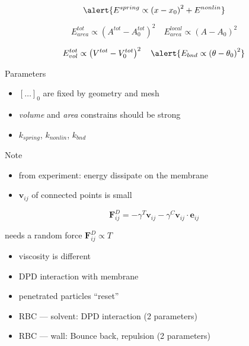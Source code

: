 \bframe{}
\bcc  
  \bc
  \ec
\ecc  
\eframe

\[
  \alert{E^{spring} \propto \left( x - x_0 \right)^2 + E^{nonlin}}
\]

\[
  E^{tot}_{area} \propto \left( A^{tot} - A_{0}^{tot} \right)^2 \quad
  E^{local}_{area} \propto \left( A - A_{0} \right)^2
\]

\[
         E^{tot}_{vol} \propto \left( V^{tot} - V_{0}^{tot} \right)^2 \quad
  \alert{E_{bnd} \propto \left(\theta - \theta_0 \right)^2}
\]

\begin{exampleblock}{Parameters}
  \begin{itemize}
  \item $[\ldots]_0$ are fixed by geometry and mesh
  \item \textit{volume} and \textit{area} constrains should be strong
  \item $k_{spring}$, $k_{nonlin}$, $k_{bnd}$
  \end{itemize}
\end{exampleblock}
\eframe

\begin{exampleblock}{Note}
  \begin{itemize}
    \item from experiment: energy dissipate on the membrane
    \item $\mathbf{v}_{ij}$ of connected points is small
  \end{itemize}
\end{exampleblock}
  
\[
\mathbf{F}_{ij}^D = - \gamma^T \mathbf{v}_{ij} - \gamma^C \mathbf{v}_{ij} \cdot \mathbf{e}_{ij}
\]

needs a random force $\mathbf{F}_{ij}^D \propto T$
\eframe

\begin{itemize}
  \item viscosity is different
  \item DPD interaction with membrane
  \item penetrated particles ``reset''
\end{itemize}
\eframe

  \begin{exampleblock}{}
    \begin{itemize}
    \item RBC --- solvent: DPD interaction (2 parameters)
    \item RBC --- wall: Bounce back, repulsion (2 parameters)
    \end{itemize}
  \end{exampleblock}
\eframe
